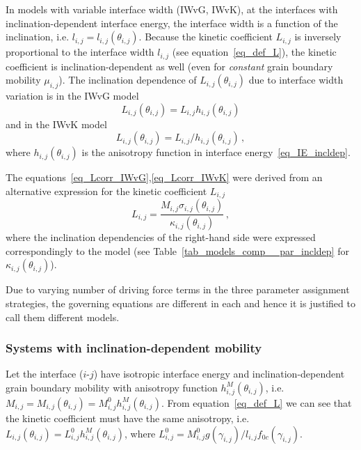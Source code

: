 		In models with variable interface width (IWvG, IWvK), at the interfaces with inclination-dependent interface energy, the interface width is a function of the inclination, i.e. $l_{i,j}=l_{i,j}(\theta_{i,j})$. Because the kinetic coefficient $L_{i,j}$ is inversely proportional to the interface width $l_{i,j}$ (see equation~\eqref{eq_def_L}), the kinetic coefficient is inclination-dependent as well (even for \textit{constant} grain boundary mobility $\mu_{i,j}$). The inclination dependence of $L_{i,j}(\theta_{i,j})$ due to interface width variation is in the IWvG model
		\begin{equation}\label{eq_Lcorr_IWvG}
			L_{i,j}(\theta_{i,j}) = L_{i,j}h_{i,j}(\theta_{i,j})
		\end{equation}
		and in the IWvK model
		\begin{equation}\label{eq_Lcorr_IWvK}
			L_{i,j}(\theta_{i,j}) = L_{i,j}/h_{i,j}(\theta_{i,j}) \,,
		\end{equation}
		where $h_{i,j}(\theta_{i,j})$ is the anisotropy function in interface energy~\eqref{eq_IE_incldep}.%
		
		The equations~\eqref{eq_Lcorr_IWvG},\eqref{eq_Lcorr_IWvK} were derived from an alternative expression for the kinetic coefficient $L_{i,j}$
		\begin{equation}
			L_{i,j} = \frac{M_{i,j}\sigma_{i,j}(\theta_{i,j})}{\kappa_{i,j}(\theta_{i,j})} \,,
		\end{equation}
		where the inclination dependencies of the right-hand side were expressed correspondingly to the model (see Table~\ref{tab_models_comp__par_incldep} for $\kappa_{i,j}(\theta_{i,j})$).
		
		Due to varying number of driving force terms in the three parameter assignment strategies, the governing equations are different in each and hence it is justified to call them different models.

		\subsubsection{Systems with inclination-dependent mobility}
		Let the interface ($i$-$j$) have isotropic interface energy and inclination-dependent grain boundary mobility with anisotropy function $h_{i,j}^M(\theta_{i,j})$, i.e. $M_{i,j}=M_{i,j}(\theta_{i,j})=M_{i,j}^0h_{i,j}^M(\theta_{i,j})$. From equation~\eqref{eq_def_L} we can see that the kinetic coefficient must have the same anisotropy, i.e. $L_{i,j}(\theta_{i,j})=L_{i,j}^0h_{i,j}^M(\theta_{i,j})$, where $L_{i,j}^0=M_{i,j}^0g(\gamma_{i,j})/l_{i,j}f_{0c}(\gamma_{i,j})$. 
		
